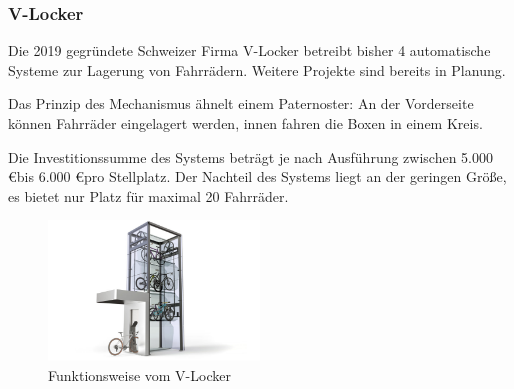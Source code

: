 \subsubsection{V-Locker}
Die 2019 gegründete Schweizer Firma V-Locker betreibt bisher 4 automatische Systeme zur Lagerung von Fahrrädern.  Weitere Projekte sind bereits in Planung. 

\noindent Das Prinzip des Mechanismus ähnelt einem Paternoster: An der Vorderseite können Fahrräder eingelagert werden, innen fahren die Boxen in einem Kreis.

\noindent Die Investitionssumme des Systems beträgt je nach Ausführung zwischen 5.000 \euro  bis 6.000 \euro  pro Stellplatz.  Der Nachteil des Systems liegt an der geringen Größe, es bietet nur Platz für maximal 20 Fahrräder.

\begin{figure}[H]
    \centering
    \includegraphics[width=0.5\textwidth]{images/vlocker.png}
    \caption{Funktionsweise vom V-Locker }
    \label{fig:vlocker}
\end{figure}
